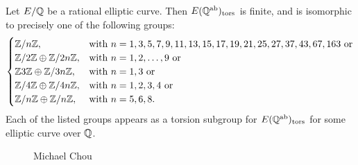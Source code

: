 \begin{frame}[plain]
\scriptsize
\begin{thm}[Chou, 2019]
Let $E/\mathbb{Q}$ be a rational elliptic curve. Then $E(\mathbb{Q}^{\text{ab}})_{\text{tors}}$ is finite, and is isomorphic to precisely one of the following groups:
	\[
	\begin{cases}
	\mathbb{Z}/n\mathbb{Z}, & \text{with } n= 1, 3, 5, 7, 9, 11, 13, 15, 17, 19, 21, 25, 27, 37, 43, 67, 163 \text{ or} \\
	\mathbb{Z}/2\mathbb{Z} \oplus \mathbb{Z}/2n\mathbb{Z}, & \text{with } n= 1, 2, \ldots, 9 \text{ or} \\
	\mathbb{Z}3\mathbb{Z} \oplus \mathbb{Z}/3n\mathbb{Z}, & \text{with } n= 1, 3 \text{ or} \\
	\mathbb{Z}/4\mathbb{Z} \oplus \mathbb{Z}/4n\mathbb{Z}, & \text{with } n= 1, 2, 3, 4 \text{ or} \\
	\mathbb{Z}/n\mathbb{Z} \oplus \mathbb{Z}/n\mathbb{Z}, & \text{with } n= 5, 6, 8.
	\end{cases}
	\]
Each of the listed groups appears as a torsion subgroup for $E(\mathbb{Q}^{\text{ab}})_{\text{tors}}$ for some elliptic curve over $\mathbb{Q}$. 
\end{thm}
	\begin{figure}[!ht]
	\centering
	\captionsetup{labelformat=empty}
	\caption{Michael Chou}
	\end{figure}
\end{frame}



